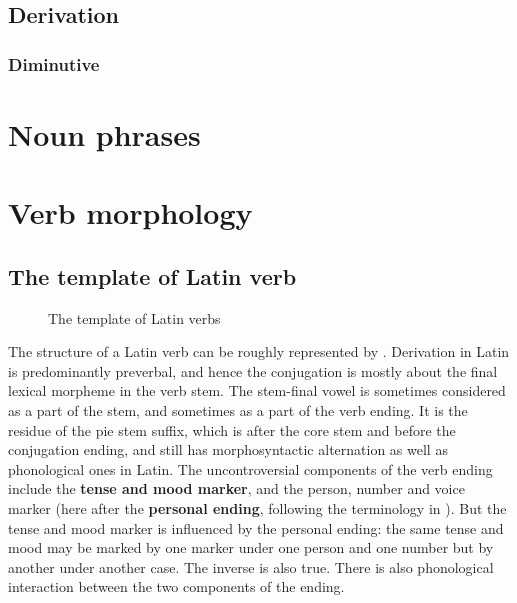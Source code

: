 \documentclass{article}
\newcommand*{\citesec}[1]{\S~{#1}}
\newcommand*{\concept}[1]{\textbf{#1}}
\begin{document}
\subsection{Derivation} %

\subsubsection{Diminutive}

\section{Noun phrases}

\section{Verb morphology}



\subsection{The template of Latin verb}\label{sec:verb-template}

\begin{figure}
    \centering
    
    \caption{The template of Latin verbs}
    \label{fig:latin-verb}
\end{figure}

The structure of a Latin verb can be roughly represented by .
Derivation in Latin is predominantly preverbal,
and hence the conjugation is mostly about the final lexical morpheme in the verb stem.
The stem-final vowel is sometimes considered as a part of the stem,
and sometimes as a part of the verb ending.
It is the residue of the \ac{pie} stem suffix, which is after the core stem and before the conjugation ending,
and still has morphosyntactic alternation as well as phonological ones in Latin. %
The uncontroversial components of the verb ending include 
the \concept{tense and mood marker},
and the person, number and voice marker 
(here after the \concept{personal ending}, 
following the terminology in \citet[\citesec{165}]{allen1903allen}).
But the tense and mood marker is influenced by the personal ending:
the same tense and mood may be marked by one marker under one person and one number
but by another under another case.
The inverse is also true.
There is also phonological interaction between the two components of the ending.
\end{document}
